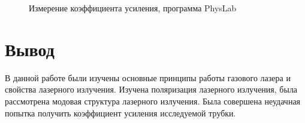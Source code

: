 \documentclass[a4paper,12pt]{article}
\theoremstyle{definition}
\begin{document}
\begin{figure}[H]
\begin{minipage}[h]{0.49\linewidth}
		\caption{Измерение коэффициента усиления, программа PhysLab}
	\end{minipage}
\end{figure}

\section{Вывод}

В данной работе были изучены основные принципы работы газового лазера и свойства лазерного излучения. Изучена поляризация лазерного излучения, была рассмотрена модовая структура лазерного излучения. Была совершена неудачная попытка получить коэффициент усиления исследуемой трубки.
\end{document}
